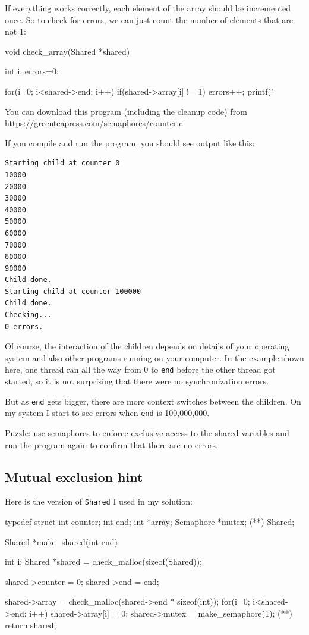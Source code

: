 \documentclass{book}
\begin{document}
If everything works correctly, each element of the array should be
incremented once.  So to check for errors, we can just count the
number of elements that are not 1:


\begin{unbreakable}[]{}
void check_array(Shared *shared) {
  int i, errors=0;

  for(i=0; i<shared->end; i++) {
    if(shared->array[i] != 1) errors++;
  }
  printf("%
}
\end{unbreakable}

You can download this program (including the cleanup code) from
\url{https://greenteapress.com/semaphores/counter.c}

If you compile and run the program, you should see output like this:

\begin{verbatim}
Starting child at counter 0
10000
20000
30000
40000
50000
60000
70000
80000
90000
Child done.
Starting child at counter 100000
Child done.
Checking...
0 errors.
\end{verbatim}

Of course, the interaction of the children depends on details
of your operating system and also other programs running on your
computer.  In the example shown here, one thread ran all the way
from 0 to {\tt end} before the other thread got started, so it is
not surprising that there were no synchronization errors.

But as {\tt end} gets bigger, there are more context switches between
the children.  On my system I start to see errors when
    {\tt end} is 100,000,000.

Puzzle: use semaphores to enforce exclusive access to the shared
variables and run the program again to confirm that there are
no errors.


\subsection{Mutual exclusion hint}

Here is the version of {\tt Shared} I used in my solution:


\begin{unbreakable}[]{}
typedef struct {
  int counter;
  int end;
  int *array;
  Semaphore *mutex;  (*\label{declaremutex}*)
} Shared;

Shared *make_shared(int end) {
 int i;
 Shared *shared = 
  check_malloc(sizeof(Shared));

 shared->counter = 0;
 shared->end = end;

 shared->array = 
  check_malloc(shared->end * sizeof(int));
 for(i=0; i<shared->end; i++) {
   shared->array[i] = 0;
 }
 shared->mutex = make_semaphore(1);  (*\label{initmutex}*)
 return shared;
}
\end{unbreakable}
\end{document}
